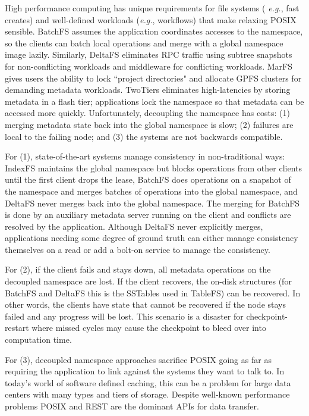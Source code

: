 High performance computing has unique requirements for file systems ({\it
e.g.}, fast creates) and well-defined workloads ({\it e.g.}, workflows) that
make relaxing POSIX sensible.  BatchFS assumes the application coordinates
accesses to the namespace, so the clients can batch local operations and merge
with a global namespace image lazily. Similarly, DeltaFS eliminates RPC
traffic using subtree snapshots for non-conflicting workloads and middleware
for conflicting workloads. MarFS gives users the ability to lock
``project directories" and allocate GPFS clusters for demanding metadata
workloads. TwoTiers eliminates high-latencies by storing metadata in a flash
tier; applications lock the namespace so that metadata can be accessed more quickly.
Unfortunately, decoupling the namespace has costs: (1) merging metadata state
back into the global namespace is slow; (2) failures are local to the failing
node; and (3) the systems are not backwards compatible. 


For (1), state-of-the-art systems manage consistency in non-traditional ways:
IndexFS maintains the global namespace but blocks operations from other clients
until the first client drops the lease, BatchFS does operations on a snapshot
of the namespace and merges batches of operations into the global namespace,
and DeltaFS never merges back into the global namespace. The merging for
BatchFS is done by an auxiliary metadata server running on the client and
conflicts are resolved by the application. Although DeltaFS never explicitly
merges, applications needing some degree of ground truth can either manage
consistency themselves on a read or add a bolt-on service to manage the
consistency.

For (2), if the client fails and stays down, all metadata operations on the
decoupled namespace are lost. If the client recovers, the on-disk structures
(for BatchFS and DeltaFS this is the SSTables used in TableFS) can be
recovered. In other words, the clients have state that cannot be recovered if
the node stays failed and any progress will be lost. This scenario is a
disaster for checkpoint-restart where missed cycles may cause the checkpoint to
bleed over into computation time.

For (3), decoupled namespace approaches sacrifice POSIX going as far as
requiring the application to link against the systems they want to talk to. In
today's world of software defined caching, this can be a problem for large data
centers with many types and tiers of storage. Despite well-known performance
problems POSIX and REST are the dominant APIs for data transfer.
